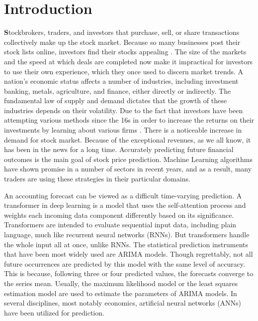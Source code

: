 \chapter{Introduction}
\label{ch:into} %

\textbf Stockbrokers, traders, and investors that purchase, sell, or share transactions 
collectively make up the stock market. Because so many businesses post their stock lists 
online, investors find their stocks appealing \cite{bhattacharjee2019stock}. The size of the 
markets and the speed at which deals are completed now make it impractical for investors to use 
their own experience, which they once used to discern market trends. A nation's economic status 
affects a number of industries, including investment banking, metals, agriculture, and finance, 
either directly or indirectly. The fundamental law of supply and demand dictates that the 
growth of these industries depends on their volatility. Due to the fact that investors have 
been attempting various methods since the 16s in order to increase the returns on their 
investments by learning about various firms \cite{mehta2021stock}. There is a noticeable 
increase in demand for stock market. Because of the exceptional revenues, as we all know, it 
has been in the news for a long time. Accurately predicting future financial outcomes is the 
main goal of stock price prediction. Machine Learning algorithms have shown promise in a number 
of sectors in recent years, and as a result, many traders are using these strategies in their 
particular domains. 

An accounting forecast can be viewed as a difficult time-varying prediction. A transformer in 
deep learning is a model that uses the self-attention process and weights each incoming data 
component differently based on its significance. Transformers are intended to evaluate 
sequential input data, including plain language, much like recurrent neural networks (RNNs). 
But transformers handle the whole input all at once, unlike RNNs. The statistical prediction 
instruments that have been most widely used are ARIMA models. Though regrettably, not all 
future occurrences are predicted by this model with the same level of accuracy. This is 
because, following three or four predicted values, the forecasts converge to the series mean. 
Usually, the maximum likelihood model or the least squares estimation model are used to 
estimate the parameters of ARIMA models. In several disciplines, most notably economics, 
artificial neural networks (ANNs) have been utilized for prediction. 

